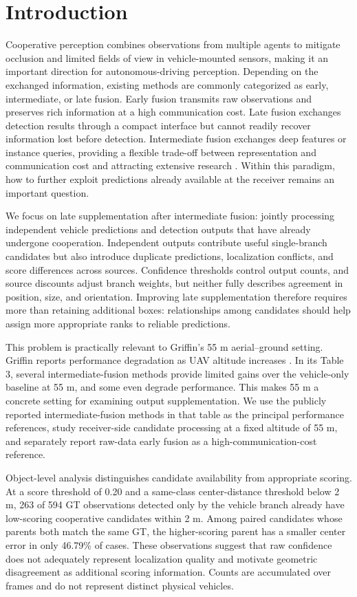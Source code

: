 \section{Introduction}

Cooperative perception combines observations from multiple agents to mitigate occlusion and limited fields of view in vehicle-mounted sensors, making it an important direction for autonomous-driving perception. Depending on the exchanged information, existing methods are commonly categorized as early, intermediate, or late fusion. Early fusion transmits raw observations and preserves rich information at a high communication cost. Late fusion exchanges detection results through a compact interface but cannot readily recover information lost before detection. Intermediate fusion exchanges deep features or instance queries, providing a flexible trade-off between representation and communication cost and attracting extensive research \cite{ref2,ref3,ref4,ref5,ref6}. Within this paradigm, how to further exploit predictions already available at the receiver remains an important question.

We focus on late supplementation after intermediate fusion: jointly processing independent vehicle predictions and detection outputs that have already undergone cooperation. Independent outputs contribute useful single-branch candidates but also introduce duplicate predictions, localization conflicts, and score differences across sources. Confidence thresholds control output counts, and source discounts adjust branch weights, but neither fully describes agreement in position, size, and orientation. Improving late supplementation therefore requires more than retaining additional boxes: relationships among candidates should help assign more appropriate ranks to reliable predictions.

This problem is practically relevant to Griffin's 55 m aerial--ground setting. Griffin reports performance degradation as UAV altitude increases \cite{ref2}. In its Table 3, several intermediate-fusion methods provide limited gains over the vehicle-only baseline at 55 m, and some even degrade performance. This makes 55 m a concrete setting for examining output supplementation. We use the publicly reported intermediate-fusion methods in that table as the principal performance references, study receiver-side candidate processing at a fixed altitude of 55 m, and separately report raw-data early fusion as a high-communication-cost reference.

Object-level analysis distinguishes candidate availability from appropriate scoring. At a score threshold of 0.20 and a same-class center-distance threshold below 2 m, 263 of 594 GT observations detected only by the vehicle branch already have low-scoring cooperative candidates within 2 m. Among paired candidates whose parents both match the same GT, the higher-scoring parent has a smaller center error in only 46.79\% of cases. These observations suggest that raw confidence does not adequately represent localization quality and motivate geometric disagreement as additional scoring information. Counts are accumulated over frames and do not represent distinct physical vehicles.

